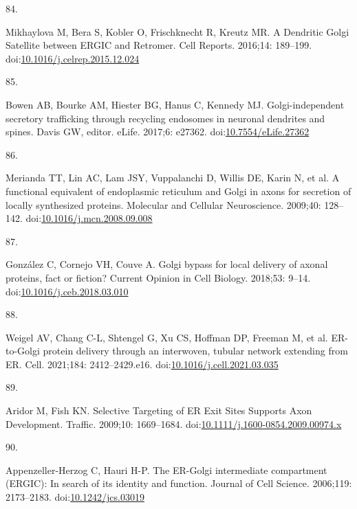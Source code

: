 \documentclass[
  12pt,
  a4paper,
]{book}
\newlength{\cslhangindent}
\newlength{\csllabelwidth}
\newlength{\cslentryspacingunit} %
\newenvironment{CSLReferences}[2] %
 {%
  \setlength{\parindent}{0pt}
  \ifodd #1
  \let\oldpar\par
  \def\par{\hangindent=\cslhangindent\oldpar}
  \fi
  \setlength{\parskip}{#2\cslentryspacingunit}
 }%
 {}
\newcommand{\CSLLeftMargin}[1]{\parbox[t]{\csllabelwidth}{#1}}
\newcommand{\CSLRightInline}[1]{\parbox[t]{\linewidth - \csllabelwidth}{#1}\break}
\begin{document}
\begin{CSLReferences}{0}{0}
\leavevmode{}%
\CSLLeftMargin{84. }%
\CSLRightInline{Mikhaylova M, Bera S, Kobler O, Frischknecht R, Kreutz MR. A {Dendritic Golgi Satellite} between {ERGIC} and {Retromer}. Cell Reports. 2016;14: 189--199. doi:\href{https://doi.org/10.1016/j.celrep.2015.12.024}{10.1016/j.celrep.2015.12.024}}

\leavevmode{}%
\CSLLeftMargin{85. }%
\CSLRightInline{Bowen AB, Bourke AM, Hiester BG, Hanus C, Kennedy MJ. Golgi-independent secretory trafficking through recycling endosomes in neuronal dendrites and spines. Davis GW, editor. eLife. 2017;6: e27362. doi:\href{https://doi.org/10.7554/eLife.27362}{10.7554/eLife.27362}}

\leavevmode{}%
\CSLLeftMargin{86. }%
\CSLRightInline{Merianda TT, Lin AC, Lam JSY, Vuppalanchi D, Willis DE, Karin N, et al. A functional equivalent of endoplasmic reticulum and {Golgi} in axons for secretion of locally synthesized proteins. Molecular and Cellular Neuroscience. 2009;40: 128--142. doi:\href{https://doi.org/10.1016/j.mcn.2008.09.008}{10.1016/j.mcn.2008.09.008}}

\leavevmode{}%
\CSLLeftMargin{87. }%
\CSLRightInline{González C, Cornejo VH, Couve A. Golgi bypass for local delivery of axonal proteins, fact or fiction? Current Opinion in Cell Biology. 2018;53: 9--14. doi:\href{https://doi.org/10.1016/j.ceb.2018.03.010}{10.1016/j.ceb.2018.03.010}}

\leavevmode{}%
\CSLLeftMargin{88. }%
\CSLRightInline{Weigel AV, Chang C-L, Shtengel G, Xu CS, Hoffman DP, Freeman M, et al. {ER-to-Golgi} protein delivery through an interwoven, tubular network extending from {ER}. Cell. 2021;184: 2412--2429.e16. doi:\href{https://doi.org/10.1016/j.cell.2021.03.035}{10.1016/j.cell.2021.03.035}}

\leavevmode{}%
\CSLLeftMargin{89. }%
\CSLRightInline{Aridor M, Fish KN. Selective {Targeting} of {ER Exit Sites Supports Axon Development}. Traffic. 2009;10: 1669--1684. doi:\href{https://doi.org/10.1111/j.1600-0854.2009.00974.x}{10.1111/j.1600-0854.2009.00974.x}}

\leavevmode{}%
\CSLLeftMargin{90. }%
\CSLRightInline{Appenzeller-Herzog C, Hauri H-P. The {ER-Golgi} intermediate compartment ({ERGIC}): In search of its identity and function. Journal of Cell Science. 2006;119: 2173--2183. doi:\href{https://doi.org/10.1242/jcs.03019}{10.1242/jcs.03019}}


\end{CSLReferences}
\end{document}
